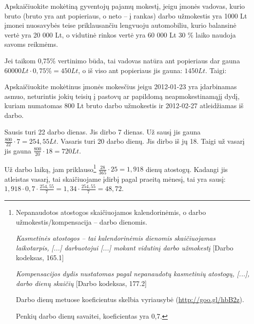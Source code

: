 \begin{tasks}
  \begin{task}
    \begin{condition}
      Apskaičiuokite mokėtiną gyventojų pajamų mokestį, jeigu
      įmonės vadovas, kurio bruto (bruto yra ant popieriaus, o
      neto – į rankas) darbo užmokestis yra 1000 Lt įmonei nuosavybės
      teise priklausančiu lengvuoju automobiliu, kurio balansinė
      vertė yra 20 000 Lt, o vidutinė rinkos vertė yra 60 000 Lt
      30 \% laiko naudoja savoms reikmėms.
    \end{condition}
    \begin{solution}
      Jei taikom 0,75\% vertinimo būda, tai vadovas natūra ant
      popieriaus dar gauna $60000Lt \cdot 0,75\% = 450 Lt$,
      o iš viso ant popieriaus jis gauna: $1450 Lt$. Taigi:

      
    \end{solution}
  \end{task}

  \begin{task}
    \begin{condition}
      Apskaičiuokite mokėtinus įmonės mokesčius jeigu 2012-01-23
      yra įdarbinamas asmuo, neturintis jokių teisių į pastovų ar
      papildomą neapmokestinamąjį dydį, kuriam numatomas 800 Lt
      bruto darbo užmokestis ir 2012-02-27 atleidžiamas iš darbo.
    \end{condition}
    \begin{solution}
      Sausis turi 22 darbo dienas. Jis dirbo 7 dienas. Už sausį jis
      gauna $\frac{800}{22} \cdot 7 = 254,55 Lt$. Vasaris turi 20 darbo
      dienų. Jis dirbo iš jų 18. Taigi už vasarį jis gauna
      $\frac{800}{20} \cdot 18 = 720 Lt$.

      Už darbo laiką, jam priklauso\footnote{%
      Nepanaudotos atostogos skaičiuojamos kalendorinėmis, o darbo
      užmokestis/kompensacija – darbo dienomis.

      \emph{Kasmetinės atostogos – tai kalendorinėmis dienomis
      skaičiuojamas laikotarpis, [...] darbuotojui [...] mokant
      vidutinį darbo užmokestį} [Darbo kodeksas, 165.1]

      \emph{Kompensacijos dydis nustatomas pagal nepanaudotų
      kasmetinių atostogų, [...], darbo dienų skaičių
      } [Darbo kodeksas, 177.2]

      Darbo dienų metuose koeficientus skelbia vyriausybė
      (\url{http://goo.gl/hbB2z}).

      Penkių darbo dienų savaitei, koeficientas yra 0,7.} 
      $\frac{28}{365} \cdot 25 = 1,918$
      dienų atostogų. Kadangi jis atleistas vasarį, tai skaičiuojame
      įdirbį pagal praeitą mėnesį, tai yra sausį:
      $1,918 \cdot 0,7 \cdot \frac{254,55}{7} %
      = 1,34 \cdot \frac{254,55}{7} = 48,72$.


\end{solution}
\end{task}
\end{tasks}
